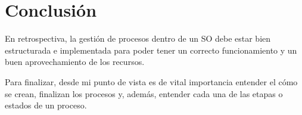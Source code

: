 \documentclass[12pt, a4paper]{article} %
\begin{document}
\clearpage
\section*{Conclusión}

En retrospectiva, la gestión de procesos dentro de un SO debe estar bien estructurada e implementada para poder tener un correcto funcionamiento y un buen aprovechamiento de los recursos.

Para finalizar, desde mi punto de vista es de vital importancia entender el cómo se crean, finalizan los procesos y, además, entender cada una de las etapas o estados de un proceso.



\nocite{*} %

\clearpage


\end{document}

